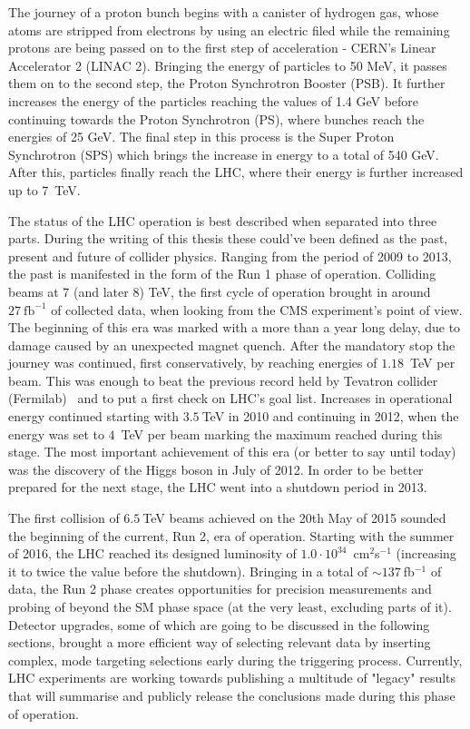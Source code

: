 \hspace{10pt} The journey of a proton bunch begins with a canister of hydrogen gas, whose atoms are stripped from electrons by using an electric filed while the remaining protons are being passed on to the first step of acceleration - CERN's Linear Accelerator 2 (LINAC 2). Bringing the energy of particles to 50 MeV, it passes them on to the second step, the Proton Synchrotron Booster (PSB).  It further increases the energy of the particles reaching the values of 1.4 GeV before continuing towards the Proton Synchrotron (PS), where bunches reach the energies of 25 GeV. The final step in this process is the Super Proton Synchrotron (SPS) which brings the increase in energy to a total of 540 GeV. After this, particles finally reach the LHC, where their energy is further increased up to 7~TeV.


\hspace{10pt} The status of the LHC operation is best described when separated into three parts. During the writing of this thesis these could've been defined as the past, present and future of collider physics. Ranging from the period of 2009 to 2013, the past is manifested in the form of the Run 1 phase of operation. Colliding beams at 7 (and later 8) TeV, the first cycle of operation brought in around $27~\text{fb}^{-1}$ of collected data, when looking from the CMS experiment's point of view. The beginning of this era was marked with a more than a year long delay, due to damage caused by an unexpected magnet quench. After the mandatory stop the journey was continued, first conservatively, by reaching energies of $1.18$~TeV per beam. This was enough to beat the previous record held by Tevatron collider (Fermilab)~\cite{tevatron_summary} and to put a first check on LHC's goal list. Increases in operational energy continued starting with $3.5~$TeV in 2010 and continuing in 2012, when the energy was set to $4$~TeV per beam marking the maximum reached during this stage. The most important achievement of this era (or better to say until today) was the discovery of the Higgs boson in July of 2012. In order to be better prepared for the next stage, the LHC went into a shutdown period in 2013. 

\hspace{10pt} The first collision of $6.5~$TeV beams achieved on the 20th May of 2015 sounded the beginning of the current, Run 2, era of operation. Starting with the summer of 2016, the LHC reached its designed luminosity of $1.0\cdot10^{34}$~cm$^2$s$^{-1}$ (increasing it to twice the value before the shutdown). Bringing in a total of $\sim137~$fb$^{-1}$ of data, the Run 2 phase creates opportunities for precision measurements and probing of beyond the SM phase space (at the very least, excluding parts of it). Detector upgrades, some of which are going to be discussed in the following sections, brought a more efficient way of selecting relevant data by inserting complex, mode targeting selections early during the triggering process. Currently, LHC experiments are working towards publishing a multitude of "legacy" results that will summarise and publicly release the conclusions made during this phase of operation.

